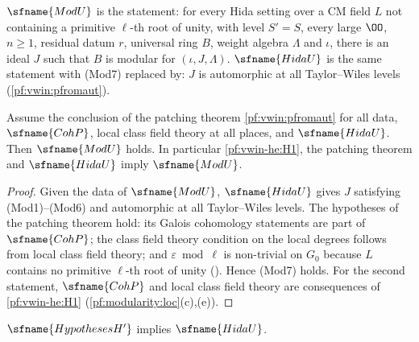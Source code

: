 \begin{definition}
\begin{enumerate}[label=(Mod\arabic*)]
\end{enumerate}
$\sfname{ModU}$ is the statement: for every Hida setting over a CM field $L$ not containing a primitive $\ell$-th root of
unity, with level $S'=S$, every large $\OO$, $n\ge1$, residual datum $r$, universal ring $B$, weight algebra $\Lambda$ and
$\iota$, there is an ideal $J$ such that $B$ is modular for $(\iota,J,\Lambda)$. $\sfname{HidaU}$ is the same statement with
(Mod7) replaced by: $J$ is automorphic at all Taylor--Wiles levels (\cref{pf:vwin:pfromaut}).
\end{definition}

\begin{lemma}\label{pf:modularity:modUof}
Assume the conclusion of the patching theorem \cref{pf:vwin:pfromaut} for all data, $\sfname{CohP}$, local class field
theory at all places, and $\sfname{HidaU}$. Then $\sfname{ModU}$ holds. In particular \ref{pf:vwin-he:H1}, the
patching theorem and $\sfname{HidaU}$ imply $\sfname{ModU}$.
\end{lemma}

\begin{proof}
Given the data of $\sfname{ModU}$, $\sfname{HidaU}$ gives $J$ satisfying (Mod1)--(Mod6) and automorphic at all Taylor--Wiles
levels. The hypotheses of the patching theorem hold: its Galois cohomology statements are part of $\sfname{CohP}$; the
class field theory condition on the local degrees follows from local class field theory; and $\varepsilon\bmod\ell$ is
non-trivial on $G_0$ because $L$ contains no primitive $\ell$-th root of unity (). Hence
(Mod7) holds. For the second statement, $\sfname{CohP}$ and local class field theory are consequences of \ref{pf:vwin-he:H1}
(\cref{pf:modularity:loc}(c),(e)).
\end{proof}

\begin{proposition}\label{pf:modularity:hidaU}
$\sfname{HypothesesH'}$ implies $\sfname{HidaU}$.
\end{proposition}

